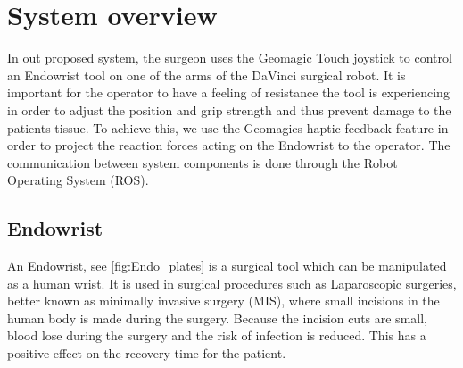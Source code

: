 \documentclass[conference]{IEEEtran}
\begin{document}
 \section{System overview}
In out proposed system, the surgeon uses the Geomagic Touch joystick to control an Endowrist tool on one of the arms of the DaVinci surgical robot.
It is important for the operator to have a feeling of resistance the tool is experiencing in order to adjust the position and grip strength and thus prevent damage to the patients tissue.
To achieve this, we use the Geomagics haptic feedback feature in order to project the reaction forces acting on the Endowrist to the operator. 
The communication between system components is done through the Robot Operating System (ROS).

\subsection{Endowrist}
An Endowrist, see \ref{fig:Endo_plates}  is a surgical tool which can be manipulated as a human wrist. 
It is used in surgical procedures such as Laparoscopic surgeries, better known as minimally invasive surgery (MIS), where small incisions in the human body is made during the surgery. 
Because the incision cuts are small, blood lose during the surgery and the risk of infection is reduced. This has a positive effect on the recovery time for the patient.
\end{document}
